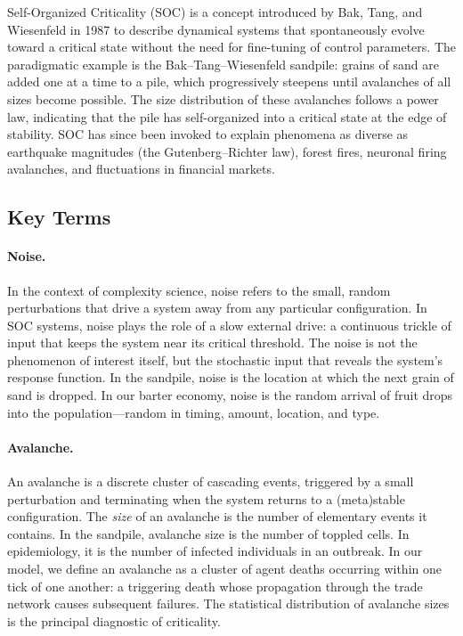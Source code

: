 \documentclass[11pt,a4paper]{article}
\begin{document}
Self-Organized Criticality (SOC) is a concept introduced by Bak, Tang, and
Wiesenfeld in 1987 to describe dynamical systems that spontaneously evolve
toward a critical state without the need for fine-tuning of control
parameters. The paradigmatic example is the Bak--Tang--Wiesenfeld sandpile:
grains of sand are added one at a time to a pile, which progressively
steepens until avalanches of all sizes become possible. The size
distribution of these avalanches follows a power law, indicating that the
pile has self-organized into a critical state at the edge of stability. SOC
has since been invoked to explain phenomena as diverse as earthquake
magnitudes (the Gutenberg--Richter law), forest fires, neuronal firing
avalanches, and fluctuations in financial markets.

\subsection{Key Terms}

\paragraph{Noise.} In the context of complexity science, noise refers to the
small, random perturbations that drive a system away from any particular
configuration. In SOC systems, noise plays the role of a slow external
drive: a continuous trickle of input that keeps the system near its critical
threshold. The noise is not the phenomenon of interest itself, but the
stochastic input that reveals the system's response function. In the
sandpile, noise is the location at which the next grain of sand is dropped.
In our barter economy, noise is the random arrival of fruit drops into the
population---random in timing, amount, location, and type.

\paragraph{Avalanche.} An avalanche is a discrete cluster of cascading
events, triggered by a small perturbation and terminating when the system
returns to a (meta)stable configuration. The \emph{size} of an avalanche is
the number of elementary events it contains. In the sandpile, avalanche size
is the number of toppled cells. In epidemiology, it is the number of
infected individuals in an outbreak. In our model, we define an avalanche as
a cluster of agent deaths occurring within one tick of one another: a
triggering death whose propagation through the trade network causes
subsequent failures. The statistical distribution of avalanche sizes is the
principal diagnostic of criticality.
\end{document}
